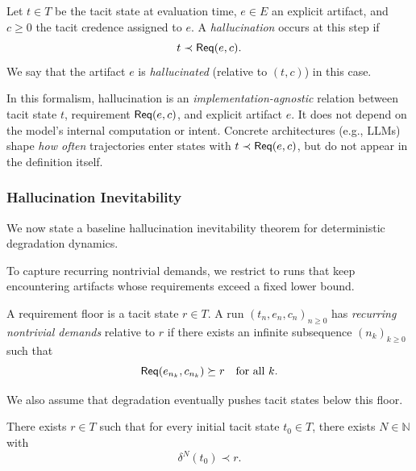 \begin{definition}[Hallucination]
Let \(t\in T\) be the tacit state at evaluation time, \(e\in E\) an
explicit artifact, and \(c\ge 0\) the tacit credence assigned to
\(e\). A \emph{hallucination} occurs at this step if
\[
t \prec \mathsf{Req}(e,c).
\]
We say that the artifact \(e\) is \emph{hallucinated} (relative to
\((t,c)\)) in this case.
\end{definition}

\begin{remark}
In this formalism, hallucination is an \emph{implementation-agnostic}
relation between tacit state \(t\), requirement \(\mathsf{Req}(e,c)\), and
explicit artifact \(e\). It does not depend on the model's internal
computation or intent. Concrete architectures (e.g., LLMs) shape
\emph{how often} trajectories enter states with \(t \prec
\mathsf{Req}(e,c)\), but do not appear in the definition itself.
\end{remark}

\subsubsection{Hallucination Inevitability}

We now state a baseline hallucination inevitability theorem for
deterministic degradation dynamics.

To capture recurring nontrivial demands, we restrict to runs that keep
encountering artifacts whose requirements exceed a fixed lower bound.

\begin{definition}
A requirement floor is a tacit state \(r\in T\). A run
\((t_n,e_n,c_n)_{n\ge 0}\) has \emph{recurring nontrivial demands}
relative to \(r\) if there exists an infinite subsequence
\((n_k)_{k\ge 0}\) such that
\[
\mathsf{Req}(e_{n_k},c_{n_k}) \succeq r
\quad\text{for all }k.
\]
\end{definition}

We also assume that degradation eventually pushes tacit states below
this floor.

\begin{assumption}
\label{assump:baseline-degradation}
There exists \(r\in T\) such that for every initial tacit state
\(t_0\in T\), there exists \(N\in\mathbb{N}\) with
\[
\delta^N(t_0) \prec r.
\]
\end{assumption}

